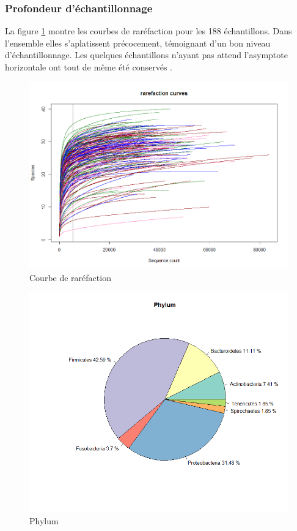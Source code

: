 \documentclass[12pt,a4paper]{article}
\begin{document}
\subsubsection{Profondeur d’échantillonnage}
La figure \ref{rarefaction} montre les courbes de raréfaction pour les 188 échantillons.
Dans l'ensemble elles s’aplatissent précocement, témoignant d’un bon niveau d'échantillonnage. Les quelques échantillons n'ayant pas attend l'asymptote horizontale ont tout de même été conservés . 

\begin{figure}[!h]
\begin{center}
\includegraphics[scale=0.5]{img/rarefaction.png}\hfill
\end{center}
\caption{Courbe de raréfaction}
\label{rarefaction}
\end{figure}


\begin{figure}[!ht]
\begin{center}
\includegraphics[scale=0.5]{img/phylum.png}\hfill
\end{center}
\caption{Phylum}
\label{phylum}
\end{figure}
\end{document}
